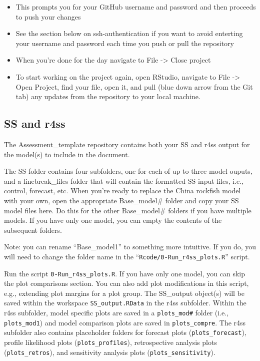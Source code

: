 \documentclass[12pt,]{article}
\providecommand{\tightlist}{%
  \setlength{\itemsep}{0pt}\setlength{\parskip}{0pt}}
\begin{document}
\begin{enumerate}
  \begin{itemize}
  \tightlist
  \item
    This prompts you for your GitHub username and password and then
    proceeds to push your changes
  \item
    See the section below on ssh-authentication if you want to avoid
    enterting your username and password each time you push or pull the
    repository
  \item
    When you're done for the day navigate to File -\textgreater{} Close
    project
  \item
    To start working on the project again, open RStudio, navigate to
    File -\textgreater{} Open Project, find your file, open it, and pull
    (blue down arrow from the Git tab) any updates from the repository
    to your local machine.
  \end{itemize}
\end{enumerate}

\subsection{SS and r4ss}\label{ss-and-r4ss}

The Assessment\_template repository contains both your SS and r4ss
output for the model(s) to include in the document.

The SS folder contains four subfolders, one for each of up to three
model ouputs, and a linebreak\_files folder that will contain the
formatted SS input files, i.e., control, forecast, etc. When you're
ready to replace the China rockfish model with your own, open the
appropriate Base\_model\# folder and copy your SS model files here. Do
this for the other Base\_model\# folders if you have multiple models. If
you have only one model, you can empty the contents of the subsequent
folders.

Note: you can rename ``Base\_model1'' to something more intuitive. If
you do, you will need to change the folder name in the
``\texttt{Rcode/0-Run\_r4ss\_plots.R}'' script.

Run the script \texttt{0-Run\_r4ss\_plots.R}. If you have only one
model, you can skip the plot comparisons section. You can also add plot
modifications in this script, e.g., extending plot margins for a plot
group. The SS\_output object(s) will be saved within the workspace
\texttt{SS\_output.RData} in the r4ss subfolder. Within the r4ss
subfolder, model specific plots are saved in a \texttt{plots\_mod\#}
folder (i.e., \texttt{plots\_mod1}) and model comparison plots are saved
in \texttt{plots\_compre}. The r4ss subfolder also contains placeholder
folders for forecast plots (\texttt{plots\_forecast}), profile
likelihood plots (\texttt{plots\_profiles}), retrospective analysis
plots (\texttt{plots\_retros}), and sensitivity analysis plots
(\texttt{plots\_sensitivity}).
\end{document}
